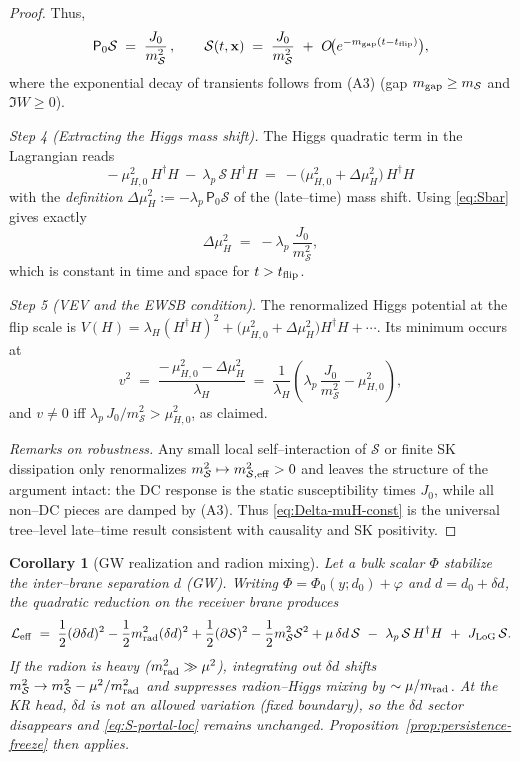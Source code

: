 \documentclass[10pt]{article}
\theoremstyle{definition}
\theoremstyle{plain}
\newtheorem{corollary}{Corollary}[section]
\begin{document}
\begin{proof}
Thus,
\begin{equation}
\label{eq:Sbar}
\mathsf P_0\mathcal S\;=\;\frac{J_0}{m_{\mathcal S}^2}\,,
\qquad
\mathcal S(t,\mathbf x)\;=\;\frac{J_0}{m_{\mathcal S}^2}\ +\ O\!\big(e^{-m_{\rm gap}(t-t_{\rm flip})}\big),
\end{equation}
where the exponential decay of transients follows from (A3) (gap $m_{\rm gap}\ge m_{\mathcal S}$ and
$\Im W\ge 0$).

\emph{Step 4 (Extracting the Higgs mass shift).}
The Higgs quadratic term in the Lagrangian reads
\[
-\ \mu_{H,0}^2\,H^\dagger H\ -\ \lambda_p\,\mathcal S\,H^\dagger H\ =\ -\big(\mu_{H,0}^2+\Delta\mu_H^2\big)\,H^\dagger H
\]
with the \emph{definition} $\Delta\mu_H^2:=-\lambda_p\,\mathsf P_0\mathcal S$ of the (late–time) mass
shift. Using \eqref{eq:Sbar} gives exactly
\[
\Delta\mu_H^2\;=\;-\lambda_p\,\frac{J_0}{m_{\mathcal S}^2},
\]
which is constant in time and space for $t>t_{\rm flip}$.

\emph{Step 5 (VEV and the EWSB condition).}
The renormalized Higgs potential at the flip scale is
$V(H)=\lambda_H(H^\dagger H)^2+\big(\mu_{H,0}^2+\Delta\mu_H^2\big)H^\dagger H+\cdots$.
Its minimum occurs at
\[
v^2\;=\;\frac{-\,\mu_{H,0}^2-\Delta\mu_H^2}{\lambda_H}
\;=\;\frac{1}{\lambda_H}\left(\lambda_p\,\frac{J_0}{m_{\mathcal S}^2}-\mu_{H,0}^2\right),
\]
and $v\neq 0$ iff $\lambda_p\,J_0/m_{\mathcal S}^2>\mu_{H,0}^2$, as claimed.

\emph{Remarks on robustness.} Any small local self–interaction of $\mathcal S$ or finite SK
dissipation only renormalizes $m_{\mathcal S}^2\mapsto m_{\mathcal S,{\rm eff}}^2>0$ and leaves the
structure of the argument intact: the DC response is the static susceptibility times $J_0$, while all
non–DC pieces are damped by (A3). Thus \eqref{eq:Delta-muH-const} is the universal tree–level late–time
result consistent with causality and SK positivity.
\end{proof}


\begin{corollary}[GW realization and radion mixing]
\label{cor:GW-realization}
Let a bulk scalar $\Phi$ stabilize the inter–brane separation $d$ (GW). Writing
$\Phi=\Phi_0(y;d_0)+\varphi$ and $d=d_0+\delta d$, the quadratic reduction on the receiver brane
produces
\begin{equation}
\label{eq:GW-reduction}
\mathcal L_{\rm eff}\;=\;\frac12(\partial \delta d)^2-\frac12 m_{\rm rad}^2(\delta d)^2
+\frac12(\partial \mathcal S)^2-\frac12 m_{\mathcal S}^2\mathcal S^2
+\mu\,\delta d\,\mathcal S\ -\ \lambda_p\,\mathcal S\,H^\dagger H\ +\ J_{\rm LoG}\,\mathcal S.
\end{equation}
If the radion is heavy ($m_{\rm rad}^2\gg \mu^2$), integrating out $\delta d$ shifts
$m_{\mathcal S}^2\to m_{\mathcal S}^2-\mu^2/m_{\rm rad}^2$ and suppresses radion–Higgs mixing by
$\sim\mu/m_{\rm rad}$. At the KR head, $\delta d$ is \emph{not}
an allowed variation (fixed boundary), so the $\delta d$ sector disappears and \eqref{eq:S-portal-loc}
remains unchanged. Proposition~\ref{prop:persistence-freeze} then applies.
\end{corollary}
\end{document}
